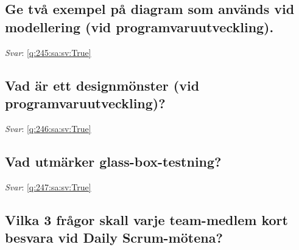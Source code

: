 \documentclass[a4paper,11pt,oneside]{article}
\begin{document}
\begin{sloppypar}
\subsection{Ge tv\r{a} exempel p\r{a} diagram som anv\"ands vid modellering (vid programvaruutveckling).}

\label{q:245:sa:sv:False}

\vspace{2cm}

\noindent\makebox[\textwidth]{\hrulefill}

\vspace{1cm}

\textit{Svar}: \autoref{q:245:sa:sv:True}



\subsection{Vad \"ar ett designm\"onster (vid programvaruutveckling)?}

\label{q:246:sa:sv:False}

\vspace{2cm}

\noindent\makebox[\textwidth]{\hrulefill}

\vspace{1cm}

\textit{Svar}: \autoref{q:246:sa:sv:True}



\subsection{Vad utm\"arker glass-box-testning?}

\label{q:247:sa:sv:False}

\vspace{2cm}

\noindent\makebox[\textwidth]{\hrulefill}

\vspace{1cm}

\textit{Svar}: \autoref{q:247:sa:sv:True}



\subsection{Vilka 3 fr\r{a}gor skall varje team-medlem kort besvara vid Daily Scrum-m\"otena?}

\label{q:248:sa:sv:False}

\vspace{2cm}


\end{sloppypar}
\end{document}
